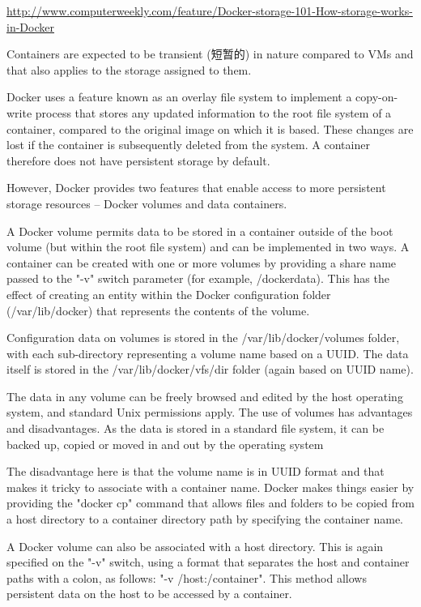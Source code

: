 \url{http://www.computerweekly.com/feature/Docker-storage-101-How-storage-works-in-Docker}

Containers are expected to be transient (短暂的) in nature compared to VMs and that also applies to the storage assigned to them.

Docker uses a feature known as an overlay file system to implement a copy-on-write process that stores any updated information to the root file system of a container, compared to the original image on which it is based. These changes are lost if the container is subsequently deleted from the system. A container therefore does not have persistent storage by default.

However, Docker provides two features that enable access to more persistent storage resources -- Docker volumes and data containers.

A Docker volume permits data to be stored in a container outside of the boot volume (but within the root file system) and can be implemented in two ways. A container can be created with one or more volumes by providing a share name passed to the "-v" switch parameter (for example, /dockerdata). This has the effect of creating an entity within the Docker configuration folder (/var/lib/docker) that represents the contents of the volume.

Configuration data on volumes is stored in the /var/lib/docker/volumes folder, with each sub-directory representing a volume name based on a UUID. The data itself is stored in the /var/lib/docker/vfs/dir folder (again based on UUID name).

The data in any volume can be freely browsed and edited by the host operating system, and standard Unix permissions apply. The use of volumes has advantages and disadvantages. As the data is stored in a standard file system, it can be backed up, copied or moved in and out by the operating system

The disadvantage here is that the volume name is in UUID format and that makes it tricky to associate with a container name. Docker makes things easier by providing the "docker cp" command that allows files and folders to be copied from a host directory to a container directory path by specifying the container name.

A Docker volume can also be associated with a host directory. This is again specified on the "-v" switch, using a format that separates the host and container paths with a colon, as follows: "-v /host:/container". This method allows persistent data on the host to be accessed by a container. 

